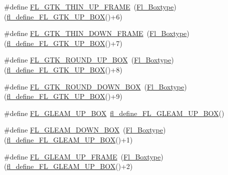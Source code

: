 \begin{DoxyCompactItemize}
\item 
\#define \hyperlink{_enumerations_8_h_a4340208bda56659fae8c7fdcbf32c244}{F\+L\+\_\+\+G\+T\+K\+\_\+\+T\+H\+I\+N\+\_\+\+U\+P\+\_\+\+F\+R\+A\+ME}~(\hyperlink{_enumerations_8_h_ae48bf9070f8541de17829f54ccacc6bc}{Fl\+\_\+\+Boxtype})(\hyperlink{_enumerations_8_h_acddcd32d55f441d62bee63ce326d5f2c}{fl\+\_\+define\+\_\+\+F\+L\+\_\+\+G\+T\+K\+\_\+\+U\+P\+\_\+\+B\+OX}()+6)
\item 
\#define \hyperlink{_enumerations_8_h_a29d0c81589c9ab30d5e6a4b2737c5a47}{F\+L\+\_\+\+G\+T\+K\+\_\+\+T\+H\+I\+N\+\_\+\+D\+O\+W\+N\+\_\+\+F\+R\+A\+ME}~(\hyperlink{_enumerations_8_h_ae48bf9070f8541de17829f54ccacc6bc}{Fl\+\_\+\+Boxtype})(\hyperlink{_enumerations_8_h_acddcd32d55f441d62bee63ce326d5f2c}{fl\+\_\+define\+\_\+\+F\+L\+\_\+\+G\+T\+K\+\_\+\+U\+P\+\_\+\+B\+OX}()+7)
\item 
\#define \hyperlink{_enumerations_8_h_a618a600f1b9483078485a15a4222dcb8}{F\+L\+\_\+\+G\+T\+K\+\_\+\+R\+O\+U\+N\+D\+\_\+\+U\+P\+\_\+\+B\+OX}~(\hyperlink{_enumerations_8_h_ae48bf9070f8541de17829f54ccacc6bc}{Fl\+\_\+\+Boxtype})(\hyperlink{_enumerations_8_h_acddcd32d55f441d62bee63ce326d5f2c}{fl\+\_\+define\+\_\+\+F\+L\+\_\+\+G\+T\+K\+\_\+\+U\+P\+\_\+\+B\+OX}()+8)
\item 
\#define \hyperlink{_enumerations_8_h_a2d0efd51e202f009819dcd5eb6113d94}{F\+L\+\_\+\+G\+T\+K\+\_\+\+R\+O\+U\+N\+D\+\_\+\+D\+O\+W\+N\+\_\+\+B\+OX}~(\hyperlink{_enumerations_8_h_ae48bf9070f8541de17829f54ccacc6bc}{Fl\+\_\+\+Boxtype})(\hyperlink{_enumerations_8_h_acddcd32d55f441d62bee63ce326d5f2c}{fl\+\_\+define\+\_\+\+F\+L\+\_\+\+G\+T\+K\+\_\+\+U\+P\+\_\+\+B\+OX}()+9)
\item 
\#define \hyperlink{_enumerations_8_h_a1c287900089242eda925b8b793c078a4}{F\+L\+\_\+\+G\+L\+E\+A\+M\+\_\+\+U\+P\+\_\+\+B\+OX}~\hyperlink{_enumerations_8_h_a85391cadfdf4d449af50dc66d2d3c1af}{fl\+\_\+define\+\_\+\+F\+L\+\_\+\+G\+L\+E\+A\+M\+\_\+\+U\+P\+\_\+\+B\+OX}()
\item 
\#define \hyperlink{_enumerations_8_h_a1feae67fdcd776ea39d3264c28712430}{F\+L\+\_\+\+G\+L\+E\+A\+M\+\_\+\+D\+O\+W\+N\+\_\+\+B\+OX}~(\hyperlink{_enumerations_8_h_ae48bf9070f8541de17829f54ccacc6bc}{Fl\+\_\+\+Boxtype})(\hyperlink{_enumerations_8_h_a85391cadfdf4d449af50dc66d2d3c1af}{fl\+\_\+define\+\_\+\+F\+L\+\_\+\+G\+L\+E\+A\+M\+\_\+\+U\+P\+\_\+\+B\+OX}()+1)
\item 
\#define \hyperlink{_enumerations_8_h_acd1bf412b2ad37448c3f616a0fdf5e34}{F\+L\+\_\+\+G\+L\+E\+A\+M\+\_\+\+U\+P\+\_\+\+F\+R\+A\+ME}~(\hyperlink{_enumerations_8_h_ae48bf9070f8541de17829f54ccacc6bc}{Fl\+\_\+\+Boxtype})(\hyperlink{_enumerations_8_h_a85391cadfdf4d449af50dc66d2d3c1af}{fl\+\_\+define\+\_\+\+F\+L\+\_\+\+G\+L\+E\+A\+M\+\_\+\+U\+P\+\_\+\+B\+OX}()+2)

\end{DoxyCompactItemize}
